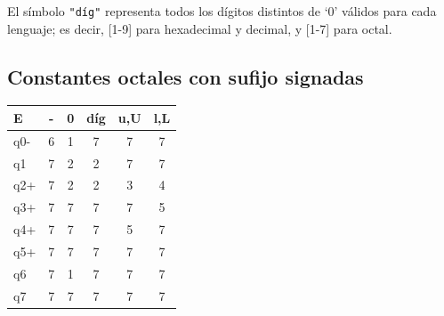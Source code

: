 \documentclass[a4paper, 12pt]{article}
\begin{document}
El símbolo \texttt{"díg"} representa todos los dígitos distintos de `0' válidos para cada lenguaje; es decir, [1-9] para hexadecimal y decimal, y [1-7] para octal.

\subsection*{Constantes octales con sufijo signadas}
\bigbreak
\begin{center}
    \begin{tabular}{||l c c c c c||}
        \hline
        E & - & 0 & díg & u,U & l,L \\
        \hline\hline
        q0- &6&1&7&7&7 \\ \hline
        q1  &7&2&2&7&7 \\ \hline
        q2+ &7&2&2&3&4 \\ \hline
        q3+ &7&7&7&7&5 \\ \hline
        q4+ &7&7&7&5&7 \\ \hline
        q5+ &7&7&7&7&7 \\ \hline
        q6  &7&1&7&7&7 \\ \hline
        q7  &7&7&7&7&7 \\ \hline
    \end{tabular}
\end{center}
\end{document}

